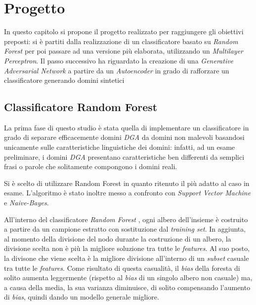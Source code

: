 \chapter{Progetto}
\label{progetto}

In questo capitolo si propone il progetto realizzato per raggiungere gli obiettivi preposti: si è partiti dalla realizzazione di un classificatore basato su \textit{Random Forest} per poi passare ad una versione più elaborata, utilizzando un \textit{Multilayer Perceptron}. Il passo successivo ha riguardato la creazione di una \textit{Generative Adversarial Network} a partire da un \textit{Autoencoder} in grado di rafforzare un classificatore generando domini sintetici


\section{Classificatore Random Forest}
\label{randomforest}
La prima fase di questo studio è stata quella di implementare un classificatore in grado di separare efficacemente domini \textit{DGA} da domini non malevoli basandosi unicamente sulle caratteristiche linguistiche dei domini: infatti, ad un esame preliminare, i domini \textit{DGA} presentano caratteristiche ben differenti da semplici frasi o parole che solitamente compongono i domini reali.

Si è scelto di utilizzare Random Forest in quanto ritenuto il più adatto al caso in esame. L'algoritmo è stato inoltre messo a confronto con \textit{Support Vector Machine} e \textit{Naive-Bayes}. 

All'interno del classificatore \textit{Random Forest} \cite{randomforest}, ogni albero dell'insieme è costruito a partire da un campione estratto con sostituzione dal \textit{training set}. In aggiunta, al momento della divisione del nodo durante la costruzione di un albero, la divisione scelta non è più la migliore soluzione tra tutte le \textit{features}. Al suo posto, la divisone che viene scelta è la migliore divisione all'interno di un \textit{subset} casuale tra tutte le \textit{features}. Come risultato di questa casualità, il \textit{bias} della foresta di solito aumenta leggermente (rispetto al \textit{bias} di un singolo albero non casuale) ma, a causa della media, la sua varianza diminuisce, di solito compensando l'aumento di \textit{bias}, quindi dando un modello generale migliore.

